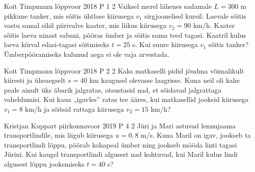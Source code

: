 \documentclass[11pt]{article}
\begin{document}
{%
{Koit Timpmann} %
{lõppvoor} %
{2018} %
{P 1} %
{2} %
{
\ifStatement
Vaiksel merel lähenes sadamale $L = 300$ m pikkune tanker, mis sõitis ühtlase kiirusega $v_1$ sirgjoonelisel kursil. Laevale sõitis vastu samal sihil piirivalve kaater, mis liikus kiirusega $v_2 = 90$ km/h. Kaater sõitis laeva ninast sabani, pööras ümber ja sõitis sama teed tagasi. Kaatril kulus laeva kõrval edasi-tagasi sõitmiseks $t = 25$ s. Kui suure kiirusega $v_1$ sõitis tanker? Ümberpööramiseks kulunud aega ei ole vaja arvestada. 
\fi
}

{Koit Timpmann} %
{lõppvoor} %
{2018} %
{P 2} %
{2} %
{
\ifStatement
Kaks matkaselli pidid jõudma võimalikult kiiresti ja üheaegselt $s = 40$ km kaugusel olevasse laagrisse. Kuna neil oli kahe peale ainult üks äbarik jalgratas, otsustasid nad, et sõidavad jalgrattaga vaheldumisi. Kui kaua „igavles” ratas tee ääres, kui matkasellid jooksid kiirusega $v_1 = 8$ km/h ja sõitsid rattaga kiirusega $v_2 = 15$ km/h?
\fi
}

{Kristjan Kuppart} %
{piirkonnavoor} %
{2019} %
{P 4} %
{2} %
{
\ifStatement
Jüri ja Mari astuvad lennujaama transportlindile, mis liigub kiirusega $u = 0,8$ m/s. Kuna Maril on igav, jookseb ta transportlindi lõppu, pöörab kohapeal ümber ning jookseb mööda linti tagasi Jürini. Kui kaugel transportlindi algusest nad kohtuvad, kui Maril kulus lindi algusest lõppu jooksmiseks $t = 40$ s?
\fi
}


}
\end{document}
